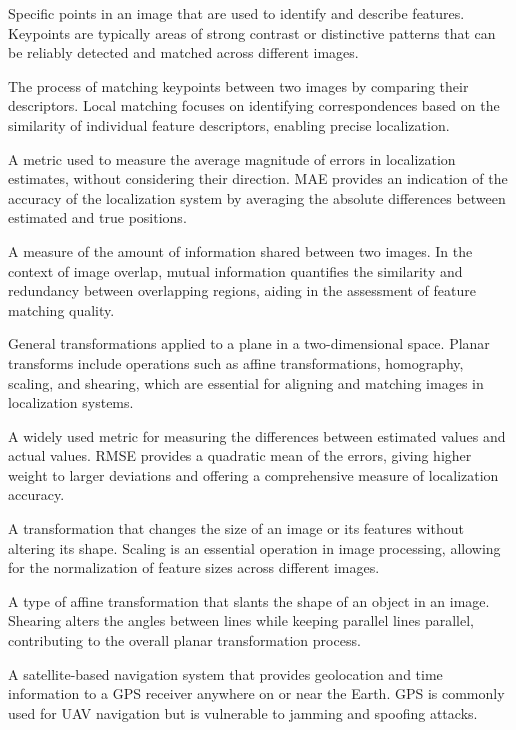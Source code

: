 \begin{description}[leftmargin=!, labelwidth=\widthof{\bfseries Mutual Information}]
    \item[\textbf{Keypoints}] 
    Specific points in an image that are used to identify and describe features. Keypoints are typically areas of strong contrast or distinctive patterns that can be reliably detected and matched across different images.

    \item[\textbf{Local Matching}] 
    The process of matching keypoints between two images by comparing their descriptors. Local matching focuses on identifying correspondences based on the similarity of individual feature descriptors, enabling precise localization.

    \item[\textbf{MAE (Mean Absolute Error)}] 
    A metric used to measure the average magnitude of errors in localization estimates, without considering their direction. MAE provides an indication of the accuracy of the localization system by averaging the absolute differences between estimated and true positions.

    \item[\textbf{Mutual Information}] 
    A measure of the amount of information shared between two images. In the context of image overlap, mutual information quantifies the similarity and redundancy between overlapping regions, aiding in the assessment of feature matching quality.

    \item[\textbf{Planar Transforms}] 
    General transformations applied to a plane in a two-dimensional space. Planar transforms include operations such as affine transformations, homography, scaling, and shearing, which are essential for aligning and matching images in localization systems.

    \item[\textbf{RMSE (Root Mean Square Error)}] 
    A widely used metric for measuring the differences between estimated values and actual values. RMSE provides a quadratic mean of the errors, giving higher weight to larger deviations and offering a comprehensive measure of localization accuracy.

    \item[\textbf{Scaling}] 
    A transformation that changes the size of an image or its features without altering its shape. Scaling is an essential operation in image processing, allowing for the normalization of feature sizes across different images.

    \item[\textbf{Shearing}] 
    A type of affine transformation that slants the shape of an object in an image. Shearing alters the angles between lines while keeping parallel lines parallel, contributing to the overall planar transformation process.

    \item[\textbf{GPS (Global Positioning System)}] 
    A satellite-based navigation system that provides geolocation and time information to a GPS receiver anywhere on or near the Earth. GPS is commonly used for UAV navigation but is vulnerable to jamming and spoofing attacks.

\end{description}

